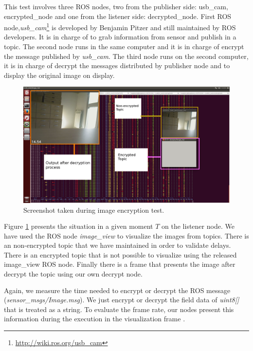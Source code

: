 \documentclass[journal,twoside]{JoPhA}
\begin{document}
This test involves three ROS nodes, two from the publisher side: usb\_cam, encrypted\_node and one from the listener side: decrypted\_node. First ROS node,{\em usb\_cam}\footnote{\url{http://wiki.ros.org/usb_cam}} is developed by Benjamin Pitzer and still maintained by ROS developers. It is in charge of to grab information from sensor and publish in a topic.
The second node runs in the same computer and it is in charge of encrypt the message published by {\em usb\_cam}. The third node runs on the second computer, it is in charge of decrypt the messages distributed by publisher node and to display the original image on display.
\begin{figure}[ht!]
	\centering
	\includegraphics[width=.99\textwidth]{Screenshot.png}
	\caption{Screenshot taken during image encryption test.}
	\label{fig:screenshot}
\end{figure}



Figure \ref{fig:screenshot} presents the situation in a given moment $T$ on the listener node. We have used the ROS node {\em image\_view} to visualize the images from topics.  There is an non-encrypted topic that we have maintained in order to validate delays. There is an encrypted topic that is not possible to visualize using the released image\_view ROS node. Finally there is a frame that presents the image after decrypt the topic using our own decrypt node. 



Again, we measure the time needed to encrypt or decrypt the ROS message ({\em sensor\_msgs/Image.msg}). We just encrypt or decrypt the field data of {\em uint8[]} that is treated as a string. To evaluate  the frame rate, our nodes present this information during the execution in the visualization frame . 
\end{document}
